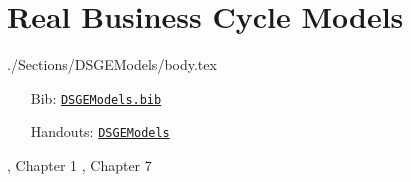 \documentclass{\econtex}\newcommand{\texname}{Syllabus}
\begin{document}
\section{Real Business Cycle Models}
\begin{verbatimwrite}{./Sections/DSGEModels/body.tex}
\begin{itemize}
\item[Bib:] \texttt{\href{http://www.econ2.jhu.edu/people/ccarroll/courses/Choice/Syllabus/DSGEModels.bib}{DSGEModels.bib}}
\item[Handouts:]  \texttt{\href{http://www.econ2.jhu.edu/people/ccarroll/courses/choice/LectureNotes/DSGEModels}{DSGEModels}}
\end{itemize}

\providecommand{\blf}{\cite{blanchard&fischer:text}}
\providecommand{\ro}{\cite{romer:text}}
\bi
\reqd \blf, Chapter 1
\reqd \blf, Chapter 7
\reqd \cite{prescottTheoryAhead}
\reqd \cite{summers:skeptical}
\ei

\end{verbatimwrite}



\ifPost
{} 
\fi
\pagebreak

\renewcommand\refname{\noindent{\href{http://www.econ2.jhu.edu/people/ccarroll/courses/Choice/Syllabus.bib}{\large Readings {\small (click to download \texttt{.bib} file)}}}}


\end{document}
